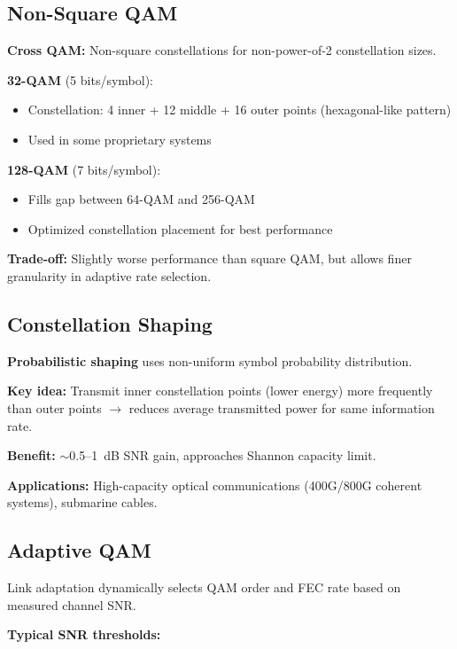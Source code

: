 \subsection{Non-Square QAM}

\textbf{Cross QAM:} Non-square constellations for non-power-of-2 constellation sizes.

\textbf{32-QAM} (5 bits/symbol):
\begin{itemize}
\item Constellation: 4 inner + 12 middle + 16 outer points (hexagonal-like pattern)
\item Used in some proprietary systems
\end{itemize}

\textbf{128-QAM} (7 bits/symbol):
\begin{itemize}
\item Fills gap between 64-QAM and 256-QAM
\item Optimized constellation placement for best performance
\end{itemize}

\textbf{Trade-off:} Slightly worse performance than square QAM, but allows finer granularity in adaptive rate selection.

\subsection{Constellation Shaping}

\textbf{Probabilistic shaping} uses non-uniform symbol probability distribution.

\textbf{Key idea:} Transmit inner constellation points (lower energy) more frequently than outer points $\rightarrow$ reduces average transmitted power for same information rate.

\textbf{Benefit:} $\sim$0.5--1~dB SNR gain, approaches Shannon capacity limit.

\textbf{Applications:} High-capacity optical communications (400G/800G coherent systems), submarine cables.

\subsection{Adaptive QAM}

Link adaptation dynamically selects QAM order and FEC rate based on measured channel SNR.

\textbf{Typical SNR thresholds:}

